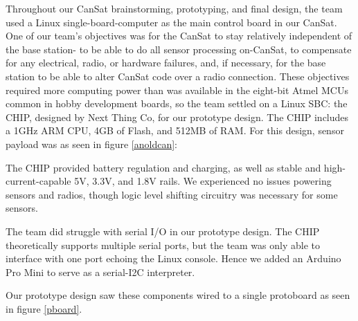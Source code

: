 \documentclass[]{report}
\begin{document}
Throughout our CanSat brainstorming, prototyping, and final design, the team used a Linux single-board-computer as the main control board in our CanSat. One of our team's objectives was for the CanSat to stay relatively independent of the base station- to be able to do all sensor processing on-CanSat, to compensate for any electrical, radio, or hardware failures, and, if necessary, for the base station to be able to alter CanSat code over a radio connection. These objectives required more computing power than was available in the eight-bit Atmel MCUs common in hobby development boards, so the team settled on a Linux SBC: the CHIP, designed by Next Thing Co, for our prototype design. The CHIP includes a 1GHz ARM CPU, 4GB of Flash, and 512MB of RAM. For this design, sensor payload was as seen in figure \ref{anoldcan}: 

The CHIP provided battery regulation and charging, as well as stable and high-current-capable 5V, 3.3V, and 1.8V rails. We experienced no issues powering sensors and radios, though logic level shifting circuitry was necessary for some sensors.

The team did struggle with serial I/O in our prototype design. The CHIP theoretically supports multiple serial ports, but the team was only able to interface with one port echoing the Linux console. Hence we added an Arduino Pro Mini to serve as a serial-I2C interpreter. 

Our prototype design saw these components wired to a single protoboard as seen in figure \ref{pboard}.
\end{document}
